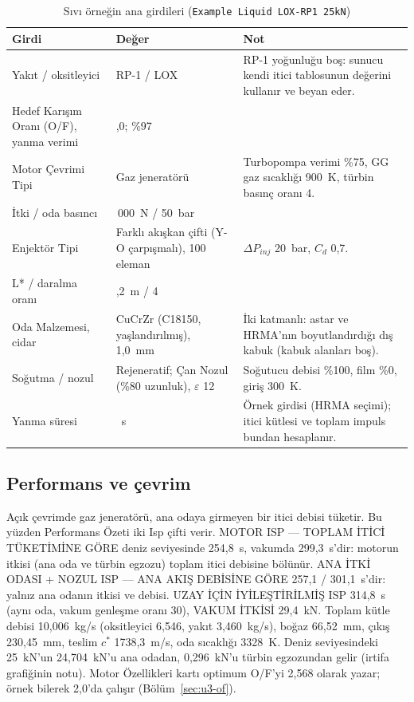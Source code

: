 \documentclass[11pt,a4paper]{article}
\newcommand{\ui}[1]{\textsf{#1}}
\newcommand{\kod}[1]{\texttt{#1}}
\begin{document}
\begin{table}[htbp]
\centering\small
\caption{Sıvı örneğin ana girdileri (\kod{Example Liquid LOX-RP1 25kN})}\label{tab:u3-girdi}
\begin{tabular}{@{}>{\raggedright\arraybackslash}p{5.4cm}>{\raggedright\arraybackslash}p{3.8cm}>{\raggedright\arraybackslash}p{6.4cm}@{}}
\toprule
\textbf{Girdi} & \textbf{Değer} & \textbf{Not} \\
\midrule
Yakıt / oksitleyici & RP-1 / LOX & RP-1 yoğunluğu boş: sunucu kendi itici tablosunun değerini kullanır ve beyan eder. \\
\ui{Hedef Karışım Oranı (O/F)}, yanma verimi & 2,0; \%97 & \\
\ui{Motor Çevrimi Tipi} & Gaz jeneratörü & Turbopompa verimi \%75, GG gaz sıcaklığı 900~K, türbin basınç oranı 4. \\
İtki / oda basıncı & 25\,000~N / 50~bar & \\
\ui{Enjektör Tipi} & \ui{Farklı akışkan çifti (Y-O çarpışmalı)}, 100 eleman & $\Delta P_{inj}$ 20~bar, $C_d$ 0,7. \\
L* / daralma oranı & 1,2~m / 4 & \\
\ui{Oda Malzemesi}, cidar & \ui{CuCrZr (C18150, yaşlandırılmış)}, 1,0~mm & İki katmanlı: astar ve HRMA'nın boyutlandırdığı dış kabuk (kabuk alanları boş). \\
Soğutma / nozul & Rejeneratif; \ui{Çan Nozul (\%80 uzunluk)}, $\varepsilon$ 12 & Soğutucu debisi \%100, film \%0, giriş 300~K. \\
Yanma süresi & 30~s & Örnek girdisi (HRMA seçimi); itici kütlesi ve toplam impuls bundan hesaplanır. \\
\bottomrule
\end{tabular}
\end{table}

\subsection{Performans ve çevrim}

Açık çevrimde gaz jeneratörü, ana odaya girmeyen bir itici debisi tüketir.
Bu yüzden \ui{Performans Özeti} iki Isp çifti verir. \ui{MOTOR ISP — TOPLAM
İTİCİ TÜKETİMİNE GÖRE} deniz seviyesinde 254,8~s, vakumda 299,3~s'dir: motorun
itkisi (ana oda ve türbin egzozu) toplam itici debisine bölünür. \ui{ANA İTKİ
ODASI + NOZUL ISP — ANA AKIŞ DEBİSİNE GÖRE} 257,1 / 301,1~s'dir: yalnız ana
odanın itkisi ve debisi. \ui{UZAY İÇİN İYİLEŞTİRİLMİŞ ISP} 314,8~s (aynı oda,
vakum genleşme oranı 30), \ui{VAKUM İTKİSİ} 29,4~kN. Toplam kütle debisi
10,006~kg/s (oksitleyici 6,546, yakıt 3,460~kg/s), boğaz 66,52~mm, çıkış
230,45~mm, teslim $c^*$ 1738,3~m/s, oda sıcaklığı 3328~K. Deniz seviyesindeki
25~kN'un 24,704~kN'u ana odadan, 0,296~kN'u türbin egzozundan gelir (irtifa
grafiğinin notu). \ui{Motor Özellikleri} kartı optimum O/F'yi
2,568 olarak yazar; örnek bilerek 2,0'da çalışır (Bölüm~\ref{sec:u3-of}).
\end{document}
